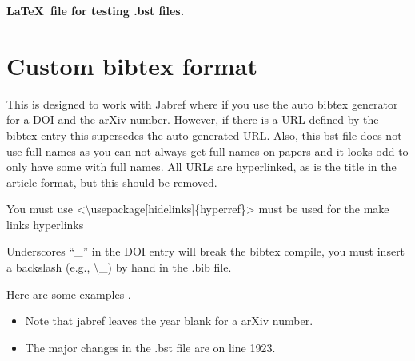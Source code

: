 \documentclass[11pt,letterpaper]{article}
\begin{document}
\begin{center}{\Large 
	\textbf{\LaTeX\ file for testing .bst files.}}
\end{center}





	
		
		
		
	\section{Custom bibtex format}		

	This is designed to work with Jabref where if you use the auto bibtex generator for a DOI and the arXiv number. However, if there is a URL defined by the bibtex entry this supersedes the auto-generated URL. Also, this bst file does not use full names as you can not always get full names on papers and it looks odd to only have some with full names. All URLs are hyperlinked, as is the title in the article format, but this should be removed. 
	
	
	You must use <\textbackslash usepackage[hidelinks]\{hyperref\}> must be used for the make links hyperlinks
	
	Underscores ``\_'' in the DOI entry will break the bibtex compile, you must insert a backslash (e.g., \textbackslash \_) by hand in the .bib file. 
	
	
	
	
	
	
	Here are some examples \cite{test1,test2,test3,test4,test5,test6,test7,test8,test9}.	
	
	\begin{itemize}
	\item Note that jabref leaves the year blank for a arXiv number. 
	\item The major changes in the .bst file are on line 1923.
	\end{itemize}
	
	
	
	



			
\pagestyle{empty}
	\FloatBarrier
	\renewcommand{\thepage}{}
	\renewcommand\refname{References Cited}
	
\end{document}
